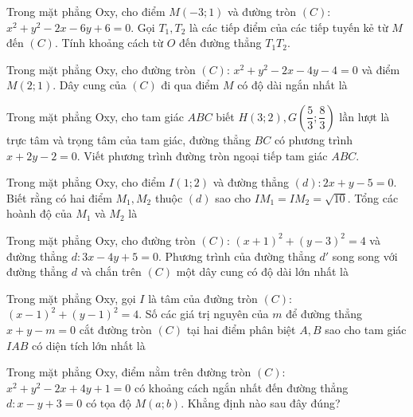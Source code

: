 \documentclass[12pt,a4paper]{book}
\begin{document}
\begin{ex}
Trong mặt phẳng Oxy, cho điểm $M(-3;1)$ và đường tròn $(C)$: $x^2 + y^2 - 2x - 6y + 6 = 0$. Gọi $T_1, T_2$ là các tiếp điểm của các tiếp tuyến kẻ từ $M$ đến $(C)$. Tính khoảng cách từ $O$ đến đường thẳng $T_1T_2$.
\loigiai{}
\end{ex}

\begin{ex}
Trong mặt phẳng Oxy, cho đường tròn $(C)$: $x^2 + y^2 - 2x - 4y - 4 = 0$ và điểm $M(2;1)$. Dây cung của $(C)$ đi qua điểm $M$ có độ dài ngắn nhất là
\loigiai{}
\end{ex}

\begin{ex}
Trong mặt phẳng Oxy, cho tam giác $ABC$ biết $H(3;2), G\left(\dfrac{5}{3};\dfrac{8}{3}\right)$ lần lượt là trực tâm và trọng tâm của tam giác, đường thẳng $BC$ có phương trình $x + 2y - 2 = 0$. Viết phương trình đường tròn ngoại tiếp tam giác $ABC$.
\loigiai{}
\end{ex}

\begin{ex}
Trong mặt phẳng Oxy, cho điểm $I(1;2)$ và đường thẳng $(d): 2x + y - 5 = 0$. Biết rằng có hai điểm $M_1, M_2$ thuộc $(d)$ sao cho $IM_1 = IM_2 = \sqrt{10}$. Tổng các hoành độ của $M_1$ và $M_2$ là
\loigiai{}
\end{ex}

\begin{ex}
Trong mặt phẳng Oxy, cho đường tròn $(C)$: $(x+1)^2 + (y-3)^2 = 4$ và đường thẳng $d: 3x - 4y + 5 = 0$. Phương trình của đường thẳng $d'$ song song với đường thẳng $ d $ và chắn trên $(C)$ một dây cung có độ dài lớn nhất là
\loigiai{}
\end{ex}

\begin{ex}
Trong mặt phẳng Oxy, gọi $I$ là tâm của đường tròn $(C)$: $(x-1)^2 + (y-1)^2 = 4$. Số các giá trị nguyên của $ m $ để đường thẳng $x + y - m = 0$ cắt đường tròn $(C)$ tại hai điểm phân biệt $A, B$ sao cho tam giác $IAB$ có diện tích lớn nhất là
\loigiai{}
\end{ex}

\begin{ex}
Trong mặt phẳng Oxy, điểm nằm trên đường tròn $(C)$: $x^2 + y^2 - 2x + 4y + 1 = 0$ có khoảng cách ngắn nhất đến đường thẳng $d: x - y + 3 = 0$ có tọa độ $M(a;b)$. Khẳng định nào sau đây đúng?
\loigiai{}
\end{ex}
\end{document}
